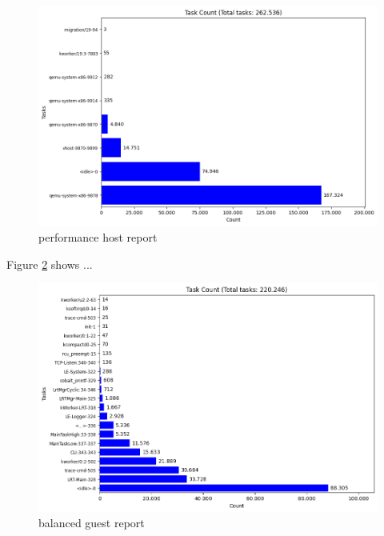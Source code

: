 \documentclass[MMR,Master,english]{twbook}
\begin{document}
\begin{figure}[H]
	\centering
	\includegraphics[width=1.0\columnwidth]{img/performance/results_host_report.png}
	\caption[performance host report]{performance host report}
	\label{fig:performance_kvm_host}
\end{figure}
\clearpage

Figure \ref{fig:performance_kvm_guest} shows ...

\begin{figure}[H]
	\centering
	\includegraphics[width=1.0\columnwidth]{img/performance/results_guest_report.png}
	\caption[balanced guest report]{balanced guest report}
	\label{fig:performance_kvm_guest}
\end{figure}
\clearpage

\end{document}
